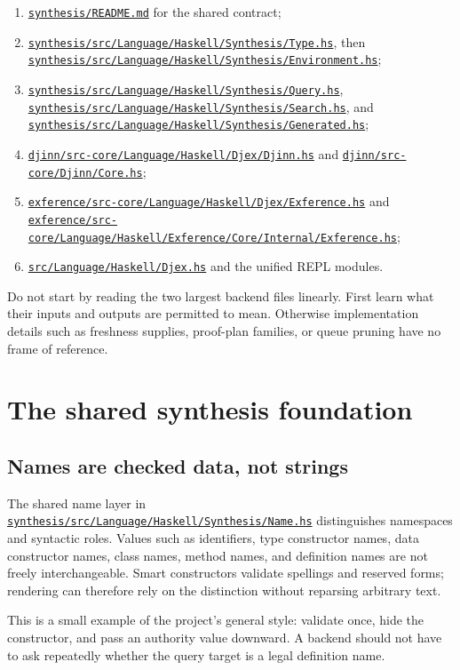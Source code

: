 \documentclass[10pt,letterpaper,oneside]{report}
\def\DjexBase{https://github.com/VladimirReshetnikov/Djex/blob/d3d9662598460316bdcd177ce6768c521e764aa8/}
\newcommand{\dpath}[1]{\href{\DjexBase#1}{\nolinkurl{#1}}}
\begin{document}
\begin{enumerate}
  \item \dpath{synthesis/README.md} for the shared contract;
  \item \dpath{synthesis/src/Language/Haskell/Synthesis/Type.hs}, then \dpath{synthesis/src/Language/Haskell/Synthesis/Environment.hs};
  \item \dpath{synthesis/src/Language/Haskell/Synthesis/Query.hs}, \dpath{synthesis/src/Language/Haskell/Synthesis/Search.hs}, and \dpath{synthesis/src/Language/Haskell/Synthesis/Generated.hs};
  \item \dpath{djinn/src-core/Language/Haskell/Djex/Djinn.hs} and \dpath{djinn/src-core/Djinn/Core.hs};
  \item \dpath{exference/src-core/Language/Haskell/Djex/Exference.hs} and \dpath{exference/src-core/Language/Haskell/Exference/Core/Internal/Exference.hs};
  \item \dpath{src/Language/Haskell/Djex.hs} and the unified REPL modules.
\end{enumerate}

Do not start by reading the two largest backend files linearly. First learn what their inputs and outputs are permitted to mean. Otherwise implementation details such as freshness supplies, proof-plan families, or queue pruning have no frame of reference.

\chapter{The shared synthesis foundation}\label{ch:djex-shared}

\section{Names are checked data, not strings}

The shared name layer in \dpath{synthesis/src/Language/Haskell/Synthesis/Name.hs} distinguishes namespaces and syntactic roles. Values such as identifiers, type constructor names, data constructor names, class names, method names, and definition names are not freely interchangeable. Smart constructors validate spellings and reserved forms; rendering can therefore rely on the distinction without reparsing arbitrary text.

This is a small example of the project's general style: validate once, hide the constructor, and pass an authority value downward. A backend should not have to ask repeatedly whether the query target is a legal definition name.
\end{document}
